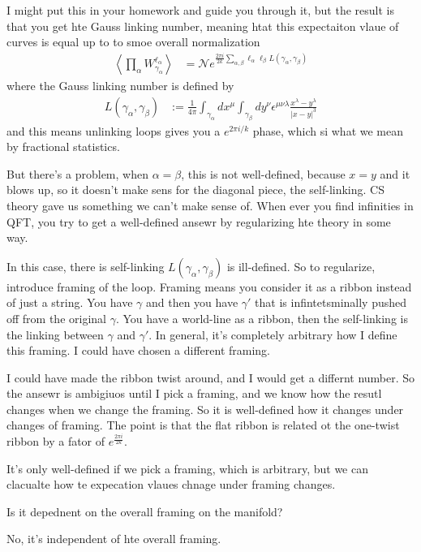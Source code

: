 I might put this in your homework and guide you through it,
but the result is that you get hte Gauss linking number,
meaning htat this expectaiton vlaue of curves is equal
up to to smoe overall normalization
\begin{align}
    \left\langle
    \prod_{\alpha} W_{\gamma_\alpha}^{\ell_\alpha}
    \right\rangle
    &=
    \mathcal{N}
    e^{\frac{2\pi i}{2k}
    \sum_{\alpha,\beta}
    \ell_\alpha \ell_\beta
    L\left( \gamma_\alpha, \gamma_\beta \right)
    }
\end{align}
where the Gauss linking number is defined by
\begin{align}
    L\left( \gamma_\alpha, \gamma_{\beta} \right)
    &:=
    \frac{1}{4\pi}
    \int_{\gamma_\alpha} dx^{\mu}
    \int_{\gamma_\beta} dy^{\nu}
    \epsilon^{\mu\nu\lambda}
    \frac{x^\lambda - y^\lambda}{|x - y|^3}
\end{align}
and this means unlinking loops gives you a $e^{2\pi i/k}$ phase,
which si what we mean by fractional statistics.

But there's a problem,
when $\alpha=\beta$,
this is not well-defined,
because $x=y$ and it blows up,
so it doesn't make sens for the diagonal piece,
the self-linking.
CS theory gave us something we can't make sense of.
When ever you find infinities in QFT,
you try to get a well-defined ansewr by regularizing hte theory in some way.

In this case,
there is self-linking $L(\gamma_\alpha, \gamma_\beta)$ is ill-defined.
So to regularize,
introduce framing of the loop.
Framing means you consider it as a ribbon instead of just a string.
You have $\gamma$ and then you have $\gamma'$ that is infintetsminally pushed
off from the original $\gamma$.
You have a world-line as a ribbon,
then the self-linking is the linking between $\gamma$ and $\gamma'$.
In general,
it's completely arbitrary how I define this framing.
I could have chosen a different framing.

I could have made the ribbon twist around,
and I would get a differnt number.
So the ansewr is ambigiuos until I pick a framing,
and we know how the resutl changes when we change the framing.
So it is well-defined how it changes under changes of framing.
The point is that the flat ribbon is related ot the one-twist ribbon
by a fator of $e^{\frac{2\pi i}{2k}}$.

It's only well-defined if we pick a framing,
which is arbitrary,
but we can clacualte how te expecation vlaues chnage under framing changes.

\begin{question}
    Is it depednent on the overall framing on the manifold?
\end{question}
No, it's independent of hte overall framing.

